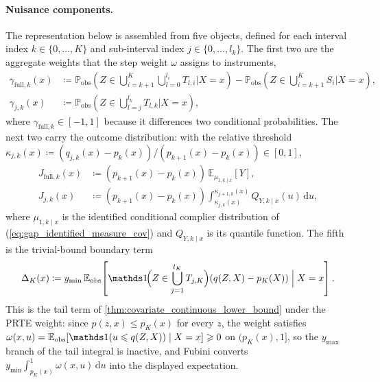\paragraph{Nuisance components.} The representation below is assembled from five objects, defined for each interval index $k \in \{0,\dots,K\}$ and sub-interval index $j \in \{0,\dots,l_k\}$. The first two are the aggregate weights that the step weight $\omega$ assigns to instruments,
\begin{align*}
    \gamma_{\text{full},k}(x) &\coloneqq \mathbb{P}_{\text{obs}}\!\left(Z \in \bigcup_{i=k+1}^K \bigcup_{l=0}^{l_i} T_{l,i} \mathrel{\Big|} X=x\right) - \mathbb{P}_{\text{obs}}\!\left(Z \in \bigcup_{i=k+1}^K S_i \mathrel{\Big|} X=x\right), \\
    \gamma_{j,k}(x) &\coloneqq \mathbb{P}_{\text{obs}}\!\left(Z \in \bigcup_{l=j}^{l_k} T_{l,k} \mathrel{\Big|} X=x\right),
\end{align*}
where $\gamma_{\mathrm{full},k}\in[-1,1]$ because it differences two conditional probabilities. The next two carry the outcome distribution: with the relative threshold $\kappa_{j,k}(x) \coloneqq (q_{j,k}(x) - p_k(x))/(p_{k+1}(x) - p_k(x)) \in [0,1]$,
\begin{align*}
    J_{\text{full},k}(x) &\coloneqq (p_{k+1}(x)-p_k(x))\,\mathbb{E}_{\mu_{1,k\mid x}}[Y], \\
    J_{j,k}(x) &\coloneqq (p_{k+1}(x)-p_k(x))\int_{\kappa_{j,k}(x)}^{\kappa_{j+1,k}(x)} Q_{Y,k\mid x}(u)\,\mathrm{d}u,
\end{align*}
where $\mu_{1,k\mid x}$ is the identified conditional complier distribution of (\ref{eq:gap_identified_measure_cov}) and $Q_{Y,k\mid x}$ is its quantile function. The fifth is the trivial-bound boundary term
\begin{equation*}
    \Delta_K(x) \coloneqq y_{\min}\, \mathbb{E}_{\text{obs}}\!\left[ \indicator\!\Big(Z \in \bigcup_{j=1}^{l_K} T_{j,K}\Big) (q(Z,X) - p_K(X)) \mathrel{\Big|} X=x \right].
\end{equation*}
This is the tail term of \cref{thm:covariate_continuous_lower_bound} under the PRTE weight: since $p(z,x)\leqslant p_K(x)$ for every $z$, the weight satisfies $\omega(x,u)=\mathbb{E}_{\text{obs}}[\indicator(u\leqslant q(Z,X))\mid X=x]\geqslant0$ on $(p_K(x),1]$, so the $y_{\max}$ branch of the tail integral is inactive, and Fubini converts $y_{\min}\int_{p_K(x)}^1\omega(x,u)\,\mathrm{d}u$ into the displayed expectation.

